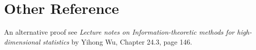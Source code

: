 \documentclass[twoside,12pt]{article}
\begin{document}
   
 







   







\section{Other Reference}

An alternative proof see \textit{Lecture notes on Information-theoretic methods for high-dimensional statistics} by Yihong Wu, Chapter 24.3, page 146.
\end{document}
